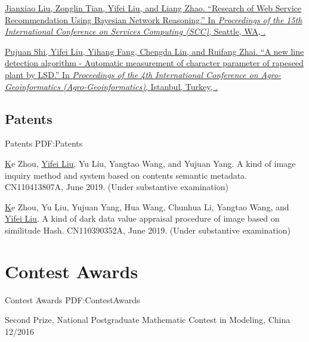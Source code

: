 \documentclass[letterpaper,10pt,oneside]{article}
\begin{document}
\begin{body}
\BigGap
\NumberedItem{[4]}
\href{https://link.springer.com/chapter/10.1007/978-3-319-94376-3_2}
{Jianxiao Liu, Zonglin Tian, \underline{Yifei Liu}, and Liang Zhao.
``Research of Web Service Recommendation Using Bayesian Network Reasoning.''
In \textit{Proceedings of the 15th International Conference on Services Computing (SCC)},
Seattle, WA,
.}

\BigGap
\NumberedItem{[5]}
\href{https://ieeexplore.ieee.org/abstract/document/7248122/}
{Pujuan Shi, \underline{Yifei Liu}, Yihang Fang, Chengda Lin, and Ruifang Zhai.
``A new line detection algorithm - Automatic measurement of character parameter of rapeseed plant by LSD.''
In \textit{Proceedings of the 4th International Conference on Agro-Geoinformatics (Agro-Geoinformatics)},
Istanbul, Turkey,
.}
\BigGap
\GapNoBreak

\subsection
{Patents}
{Patents}
{PDF:Patents}
\GapNoBreak

\NumberedItem{[1]}
\href{https://patents.google.com/patent/CN110413807A}
Ke Zhou, \underline{Yifei Liu}, Yu Liu, Yangtao Wang, and Yujuan Yang. A kind of image inquiry method and system based on contents semantic metadata. CN110413807A, June 2019. (Under substantive examination)

\BigGap
\NumberedItem{[2]}
\href{https://patents.google.com/patent/CN110390352A}
Ke Zhou, Yu Liu, Yujuan Yang, Hua Wang, Chunhua Li, Yangtao Wang, and \underline{Yifei Liu}. A kind of dark data value appraisal procedure of image based on similitude Hash. CN110390352A, June 2019. (Under substantive examination)



\section
{Contest Awards}
{Contest Awards}
{PDF:ContestAwards}

\BulletItem
Second Prize, National Postgraduate Mathematic Contest in Modeling, China
\hfill
12/2016
\GapNoBreak


\end{body}
\end{document}
